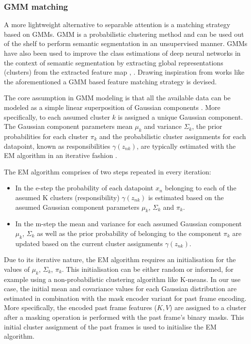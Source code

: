 \subsubsection{GMM matching}
A more lightweight alternative to separable attention is a matching strategy based on GMMs. GMM is a probabilistic clustering method and can be used out of the shelf 
to perform semantic segmentation in an unsupervised manner. GMMs have also been used to improve the class estimations of deep neural networks in the context of semantic segmentation by extracting global representations (clusters) from the extracted feature map \parencite{liang2022gmmseg}, \parencite{gmm_2022}. Drawing inspiration from works like the aforementioned a GMM based feature matching strategy is devised. \par

The core assumption in GMM modeling is that all the available data can be modeled as a simple linear superposition of Gaussian components \parencite{bishop}. More specifically, to each assumed cluster $k$ is assigned a unique Gaussian component. The Gaussian component parameters mean $\mu_k$ and variance $\Sigma_k$, the prior probabilities for each cluster $\pi_k$ and the probabilistic cluster assignments for each datapoint, known as responsibilities $\gamma(z_{nk})$, are typically estimated with the EM algorithm in an iterative fashion \parencite{bishop}. \par

The EM algorithm comprises of two steps repeated in every iteration:
\begin{itemize}

    \item In the \gls{e-step} the probability of each datapoint $x_n$ belonging to each of the assumed K clusters (responsibility) $\gamma(z_{nk})$  is estimated based on the assumed Gaussian component parameters $\mu_k$, $\Sigma_k$ and $\pi_k$.
    \item In the \gls{m-step} the mean and variance for each assumed Gaussian component $\mu_k$, $\Sigma_k$ as well as the prior probability of belonging to the component $\pi_k$  are updated based on the current cluster assignments $\gamma(z_{nk})$. 
\end{itemize}
Due to its iterative nature, the EM algorithm requires an initialisation for the values of $\mu_k$, $\Sigma_k$, $\pi_k$. This initialisation can be either random or informed, for example using a non-probabilistic clustering algorithm like K-means. In our use case, the initial mean and covariance values for each Gaussian distribution are estimated in combination with the mask encoder variant for past frame encoding.
More specifically, the encoded past frame features ($K, V$) are assigned to a cluster after a masking operation is performed with the past frame's binary masks. 
This initial cluster assignment of the past frames is used to initialise the EM algorithm. \par

